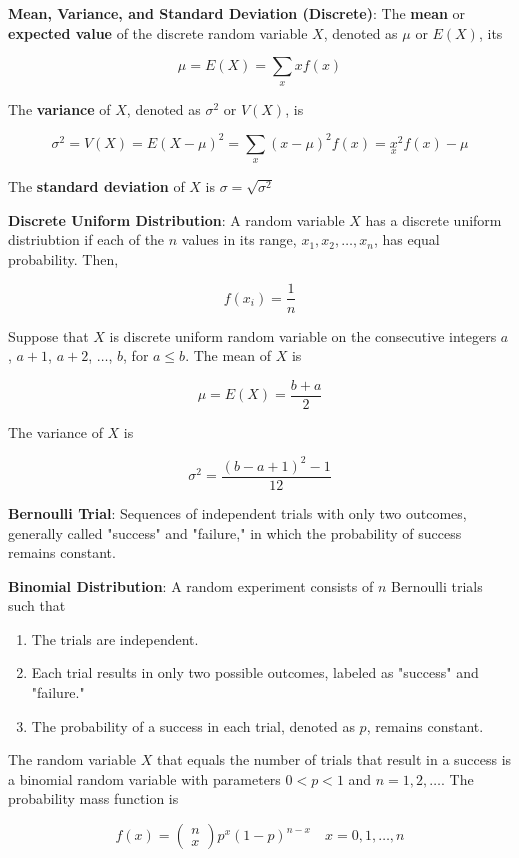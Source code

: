 \documentclass{article}
\begin{document}
\noindent\textbf{\color{blue}Mean, Variance, and Standard Deviation (Discrete)}: The \textbf{mean} or \textbf{expected value} of the discrete random variable $X$, denoted as $\mu$ or $E(X)$, its

\[\mu=E(X)=\underset{x}{\sum}xf(x)\]

The \textbf{variance} of $X$, denoted as $\sigma^2$ or $V(X)$, is

\[\sigma^2=V(X)=E(X-\mu)^2=\underset{x}{\sum}(x-\mu)^2f(x)=\underset{x}x^2f(x)-\mu\]

The \textbf{standard deviation} of $X$ is $\sigma=\sqrt{\sigma^2}$

\noindent\textbf{\color{blue}Discrete Uniform Distribution}: A random variable $X$ has a discrete uniform distriubtion if each of the $n$ values in its range, $x_1,x_2,\ldots,x_n$, has equal probability. Then,

\[f(x_i)=\frac{1}{n}\]

Suppose that $X$ is discrete uniform random variable on the consecutive integers $a$, $a+1$, $a+2$, $\ldots$, $b$, for $a\le b$. The mean of $X$ is

\[\mu=E(X)=\frac{b+a}{2}\]

The variance of $X$ is

\[\sigma^2=\frac{(b-a+1)^2-1}{12}\]

\noindent\textbf{\color{blue}Bernoulli Trial}: Sequences of independent trials with only two outcomes, generally called "success" and "failure," in which the probability of success remains constant.

\noindent\textbf{\color{blue}Binomial Distribution}: A random experiment consists of $n$ Bernoulli trials such that

\begin{enumerate}
    \item The trials are independent.
    \item Each trial results in only two possible outcomes, labeled as "success" and "failure."
    \item The probability of a success in each trial, denoted as $p$, remains constant.
\end{enumerate}

The random variable $X$ that equals the number of trials that result in a success is a binomial random variable with parameters $0<p<1$ and $n=1,2,\ldots$. The probability mass function is

\[f(x)=\begin{pmatrix}n\\x\end{pmatrix}p^x(1-p)^{n-x}\quad x=0,1,\ldots,n\]
\end{document}
